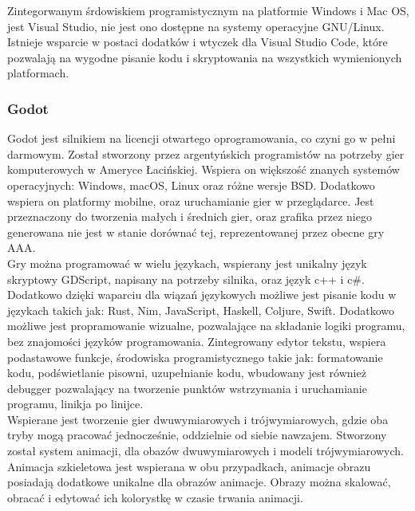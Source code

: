 \documentclass{article} %
\begin{document}
        Zintegorwanym śrdowiskiem programistycznym na platformie Windows i Mac OS, jest Visual Studio, nie jest ono dostępne na systemy operacyjne GNU/Linux. Istnieje wsparcie w postaci dodatków i wtyczek dla Visual Studio Code, które pozwalają na wygodne pisanie kodu i skryptowania na wszystkich wymienionych platformach.
        \\
         
        
        \subsubsection*{Godot}
        Godot jest silnikiem na licencji otwartego oprogramowania, co czyni go w pełni darmowym. Został stworzony przez argentyńskich programistów na potrzeby gier komputerowych w Ameryce Łacińskiej. Wspiera on większość znanych systemów operacyjnych: Windows, macOS, Linux oraz różne wersje BSD. Dodatkowo wspiera on platformy mobilne, oraz uruchamianie gier w przeglądarce. Jest przeznaczony do tworzenia małych i średnich gier, oraz grafika przez niego generowana nie jest w stanie dorównać tej, reprezentowanej przez obecne gry AAA.
        \\
        
        Gry można programować w wielu językach, wspierany jest unikalny język skryptowy GDScript, napisany na potrzeby silnika, oraz język c++ i c\#. Dodatkowo dzięki waparciu dla wiązań językowych możliwe jest pisanie kodu w językach takich jak: Rust, Nim, JavaScript, Haskell, Coljure, Swift. Dodatkowo możliwe jest propramowanie wizualne, pozwalające na składanie logiki programu, bez znajomości języków programowania. Zintegrowany edytor tekstu, wspiera podastawowe funkcje, środowiska programistycznego takie jak: formatowanie kodu, podświetlanie pisowni, uzupełnianie kodu, wbudowany jest również debugger pozwalający na tworzenie punktów wstrzymania i uruchamianie programu, linikja po linijce.
        \\
        
        Wspierane jest tworzenie gier dwuwymiarowych i trójwymiarowych, gdzie oba tryby mogą pracować jednocześnie, oddzielnie od siebie nawzajem. Stworzony został system animacji, dla obazów dwuwymiarowych i modeli trójwymiarowych. Animacja szkieletowa jest wspierana w obu przypadkach, animacje obrazu posiadają dodatkowe unikalne dla obrazów animacje. Obrazy można skalować, obracać i edytować ich kolorystkę w czasie trwania animacji. 
        \\
        
\end{document}
